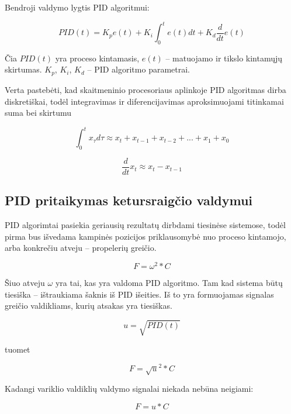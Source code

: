 \documentclass[12pt, a4paper, lithuanian, final]{article}
\begin{document}
Bendroji valdymo lygtis PID algoritmui:

\begin{equation}
	PID(t) = K_p e(t) + K_i \int_0^t e(t) dt + K_d \dfrac{d}{dt} e(t)
\end{equation}

Čia $PID(t)$ yra proceso kintamasis, $e(t)$ -- matuojamo ir tikslo kintamųjų skirtumas.
$K_p$, $K_i$, $K_d$ -- PID algoritmo parametrai.

Verta pastebėti, kad skaitmeninio procesoriaus aplinkoje PID algoritmas dirba diskretiškai, todėl integravimas ir diferencijavimas aproksimuojami titinkamai suma bei skirtumu

\begin{equation}
	\int_0^t x_{\tau}d\tau \approx x_t + x_{t - 1} + x_{t - 2} + ... + x_{1} + x_{0}
\end{equation}

\begin{equation}
	\dfrac{d}{dt}x_t \approx x_t - x_{t - 1}
\end{equation}



\subsection{PID pritaikymas ketursraigčio valdymui}

PID algorimtai pasiekia geriausių rezultatų dirbdami tiesinėse sistemose, todėl pirma bus išvedama kampinės pozicijos priklausomybė nuo proceso kintamojo, arba konkrečiu atveju -- propelerių greičio.

\begin{equation}
	F = \omega^2 * C
\end{equation}

Šiuo atveju $\omega$ yra tai, kas yra valdoma PID algoritmo. Tam kad sistema būtų tiesiška -- ištraukiama šaknis iš PID išeities.
Iš to yra formuojamas signalas greičio valdikliams, kurių atsakas yra tiesiškas.

\begin{equation}
	u = \sqrt{PID(t)}
\end{equation}

tuomet

\begin{equation}
	F = \sqrt{u}^2 * C
\end{equation}

Kadangi variklio valdiklių valdymo signalai niekada nebūna neigiami:

\begin{equation}
	F = u * C
\end{equation}
\end{document}
